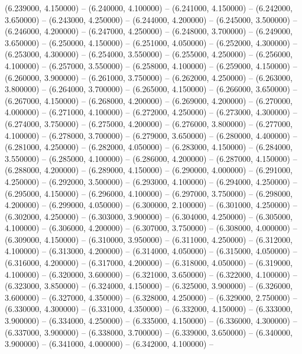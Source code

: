 (6.239000, 4.150000) -- 
(6.240000, 4.100000) -- 
(6.241000, 4.150000) -- 
(6.242000, 3.650000) -- 
(6.243000, 4.250000) -- 
(6.244000, 4.200000) -- 
(6.245000, 3.500000) -- 
(6.246000, 4.200000) -- 
(6.247000, 4.250000) -- 
(6.248000, 3.700000) -- 
(6.249000, 3.650000) -- 
(6.250000, 4.150000) -- 
(6.251000, 4.050000) -- 
(6.252000, 4.300000) -- 
(6.253000, 4.300000) -- 
(6.254000, 3.550000) -- 
(6.255000, 4.250000) -- 
(6.256000, 4.100000) -- 
(6.257000, 3.550000) -- 
(6.258000, 4.100000) -- 
(6.259000, 4.150000) -- 
(6.260000, 3.900000) -- 
(6.261000, 3.750000) -- 
(6.262000, 4.250000) -- 
(6.263000, 3.800000) -- 
(6.264000, 3.700000) -- 
(6.265000, 4.150000) -- 
(6.266000, 3.650000) -- 
(6.267000, 4.150000) -- 
(6.268000, 4.200000) -- 
(6.269000, 4.200000) -- 
(6.270000, 4.000000) -- 
(6.271000, 4.100000) -- 
(6.272000, 4.250000) -- 
(6.273000, 4.300000) -- 
(6.274000, 3.750000) -- 
(6.275000, 4.200000) -- 
(6.276000, 3.800000) -- 
(6.277000, 4.100000) -- 
(6.278000, 3.700000) -- 
(6.279000, 3.650000) -- 
(6.280000, 4.400000) -- 
(6.281000, 4.250000) -- 
(6.282000, 4.050000) -- 
(6.283000, 4.150000) -- 
(6.284000, 3.550000) -- 
(6.285000, 4.100000) -- 
(6.286000, 4.200000) -- 
(6.287000, 4.150000) -- 
(6.288000, 4.200000) -- 
(6.289000, 4.150000) -- 
(6.290000, 4.000000) -- 
(6.291000, 4.250000) -- 
(6.292000, 3.500000) -- 
(6.293000, 4.100000) -- 
(6.294000, 4.250000) -- 
(6.295000, 4.150000) -- 
(6.296000, 4.100000) -- 
(6.297000, 3.750000) -- 
(6.298000, 4.200000) -- 
(6.299000, 4.050000) -- 
(6.300000, 2.100000) -- 
(6.301000, 4.250000) -- 
(6.302000, 4.250000) -- 
(6.303000, 3.900000) -- 
(6.304000, 4.250000) -- 
(6.305000, 4.100000) -- 
(6.306000, 4.200000) -- 
(6.307000, 3.750000) -- 
(6.308000, 4.000000) -- 
(6.309000, 4.150000) -- 
(6.310000, 3.950000) -- 
(6.311000, 4.250000) -- 
(6.312000, 4.100000) -- 
(6.313000, 4.200000) -- 
(6.314000, 4.050000) -- 
(6.315000, 4.050000) -- 
(6.316000, 4.200000) -- 
(6.317000, 4.200000) -- 
(6.318000, 4.050000) -- 
(6.319000, 4.100000) -- 
(6.320000, 3.600000) -- 
(6.321000, 3.650000) -- 
(6.322000, 4.100000) -- 
(6.323000, 3.850000) -- 
(6.324000, 4.150000) -- 
(6.325000, 3.900000) -- 
(6.326000, 3.600000) -- 
(6.327000, 4.350000) -- 
(6.328000, 4.250000) -- 
(6.329000, 2.750000) -- 
(6.330000, 4.300000) -- 
(6.331000, 4.350000) -- 
(6.332000, 4.150000) -- 
(6.333000, 3.900000) -- 
(6.334000, 4.250000) -- 
(6.335000, 4.150000) -- 
(6.336000, 4.300000) -- 
(6.337000, 3.900000) -- 
(6.338000, 3.700000) -- 
(6.339000, 3.650000) -- 
(6.340000, 3.900000) -- 
(6.341000, 4.000000) -- 
(6.342000, 4.100000) -- 
